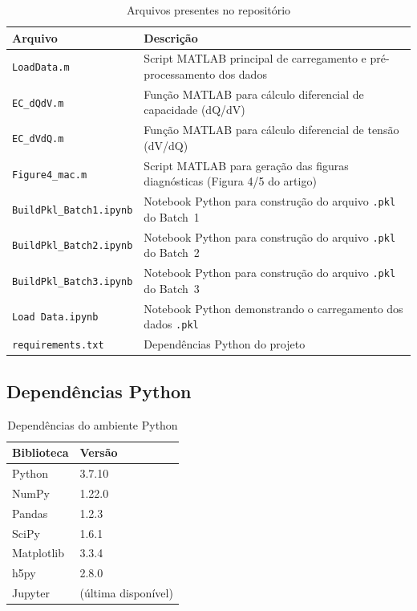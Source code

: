 \documentclass[12pt,a4paper]{article}
\begin{document}
\begin{table}[H]
\centering
\caption{Arquivos presentes no reposit\'{o}rio}
\begin{tabular}{@{}lp{9cm}@{}}
\toprule
\textbf{Arquivo} & \textbf{Descri\c{c}\~ao} \\
\midrule
\texttt{LoadData.m}         & Script MATLAB principal de carregamento e
                               pr\'{e}-processamento dos dados \\
\texttt{EC\_dQdV.m}         & Fun\c{c}\~ao MATLAB para c\'{a}lculo diferencial de capacidade
                               (dQ/dV) \\
\texttt{EC\_dVdQ.m}         & Fun\c{c}\~ao MATLAB para c\'{a}lculo diferencial de tens\~ao
                               (dV/dQ) \\
\texttt{Figure4\_mac.m}     & Script MATLAB para gera\c{c}\~ao das figuras diagn\'{o}sticas
                               (Figura 4/5 do artigo) \\
\texttt{BuildPkl\_Batch1.ipynb} & Notebook Python para constru\c{c}\~ao do arquivo
                               \texttt{.pkl} do Batch~1 \\
\texttt{BuildPkl\_Batch2.ipynb} & Notebook Python para constru\c{c}\~ao do arquivo
                               \texttt{.pkl} do Batch~2 \\
\texttt{BuildPkl\_Batch3.ipynb} & Notebook Python para constru\c{c}\~ao do arquivo
                               \texttt{.pkl} do Batch~3 \\
\texttt{Load Data.ipynb}    & Notebook Python demonstrando o carregamento dos
                               dados \texttt{.pkl} \\
\texttt{requirements.txt}   & Depend\^{e}ncias Python do projeto \\
\bottomrule
\end{tabular}
\end{table}

\subsection{Depend\^{e}ncias Python}

\begin{table}[H]
\centering
\caption{Depend\^{e}ncias do ambiente Python}
\begin{tabular}{@{}ll@{}}
\toprule
\textbf{Biblioteca} & \textbf{Vers\~ao} \\
\midrule
Python   & 3.7.10 \\
NumPy    & 1.22.0 \\
Pandas   & 1.2.3  \\
SciPy    & 1.6.1  \\
Matplotlib & 3.3.4 \\
h5py     & 2.8.0  \\
Jupyter  & (\'{u}ltima dispon\'{i}vel) \\
\bottomrule
\end{tabular}
\end{table}
\end{document}
